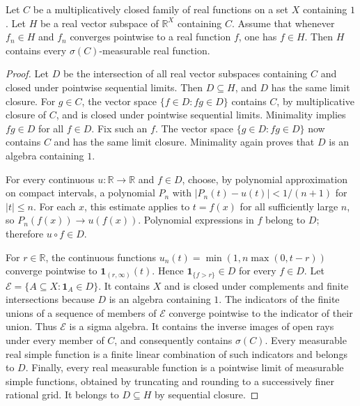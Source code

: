 \begin{lemma}
\label{lem:sequential-functional-monotone-class}
\leanok
{}
Let $C$ be a multiplicatively closed family of real functions on a set
$X$ containing $1$. Let $H$ be a real vector subspace of $\mathbb R^X$
containing $C$. Assume that whenever $f_n\in H$ and $f_n$ converges
pointwise to a real function $f$, one has $f\in H$. Then $H$ contains
every $\sigma(C)$-measurable real function.
\end{lemma}
\begin{proof}
Let $D$ be the intersection of all real vector subspaces containing
$C$ and closed under pointwise sequential limits. Then $D\subseteq H$,
and $D$ has the same limit closure. For $g\in C$, the vector space
$\{f\in D:fg\in D\}$ contains $C$, by multiplicative closure of $C$,
and is closed under pointwise sequential limits. Minimality implies
$fg\in D$ for all $f\in D$. Fix such an $f$. The vector space
$\{g\in D:fg\in D\}$ now contains $C$ and has the same limit closure.
Minimality again proves that $D$ is an algebra containing $1$.

For every continuous $u:\mathbb R\to\mathbb R$ and $f\in D$, choose,
by polynomial approximation on compact intervals, a polynomial $P_n$
with $|P_n(t)-u(t)|<1/(n+1)$ for $|t|\leq n$. For each $x$, this
estimate applies to $t=f(x)$ for all sufficiently large $n$, so
$P_n(f(x))\to u(f(x))$. Polynomial expressions in $f$ belong to $D$;
therefore $u\circ f\in D$.

For $r\in\mathbb R$, the continuous functions
$u_n(t)=\min(1,n\max(0,t-r))$ converge pointwise to
$\mathbf1_{(r,\infty)}(t)$. Hence
$\mathbf1_{\{f>r\}}\in D$ for every $f\in D$.
Let $\mathcal E=\{A\subseteq X:\mathbf1_A\in D\}$.
It contains $X$ and is closed under complements and finite
intersections because $D$ is an algebra containing $1$.
The indicators of the finite unions of a sequence of members of
$\mathcal E$ converge pointwise to the indicator of their union.
Thus $\mathcal E$ is a sigma algebra. It contains the inverse images
of open rays under every member of $C$, and consequently contains
$\sigma(C)$.
Every measurable real simple function is a finite linear combination
of such indicators and belongs to $D$. Finally, every real measurable
function is a pointwise limit of measurable simple functions, obtained
by truncating and rounding to a successively finer rational grid.
It belongs to $D\subseteq H$ by sequential closure.
\end{proof}

